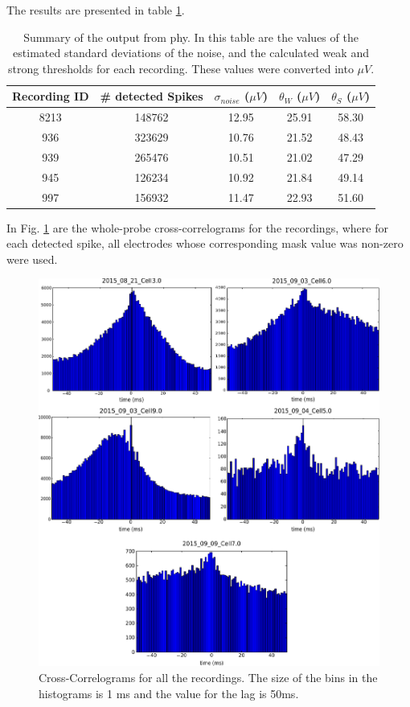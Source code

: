 \documentclass{article}
\begin{document}
The results are presented in table \ref{tab:results-from-phy}.

\begin{table}[!h]

\begin{center}
\begin{tabular}{ccccc}
Recording ID & \# detected Spikes & $\sigma_{noise}$ ($\mu V$) & $\theta_W$ ($\mu V$) & $\theta_S$ ($\mu V$) \\ \hline
8213 & 148762 &  12.95 & 25.91 & 58.30 \\ 
936 & 323629 & 10.76 & 21.52 & 48.43 \\ 
939 & 265476 & 10.51 & 21.02 & 47.29 \\ 
945 & 126234 & 10.92 & 21.84 & 49.14 \\ 
997 & 156932 & 11.47 & 22.93 & 51.60 \\ 
\end{tabular}
\end{center}
\caption{Summary of the output from phy. In this table are the values of the estimated standard deviations of the noise, and the calculated weak and strong thresholds for each recording. These values were converted into $\mu V$.}
\label{tab:results-from-phy}
\end{table}

In Fig. \ref{fig:CC} are the whole-probe cross-correlograms for the recordings, where for each detected spike, all electrodes whose corresponding mask value was non-zero were used.

\begin{figure}[!h]
	\centering
	\includegraphics[width=\linewidth]{CC.pdf}
	\caption{Cross-Correlograms for all the recordings. The size of the bins in the histograms is 1 ms and the value for the lag is 50ms.
}
\label{fig:CC}
\end{figure}
\end{document}
